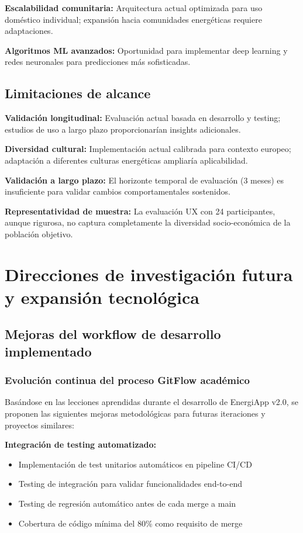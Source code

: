 \textbf{Escalabilidad comunitaria:} Arquitectura actual optimizada para uso doméstico individual; expansión hacia comunidades energéticas requiere adaptaciones.

\textbf{Algoritmos ML avanzados:} Oportunidad para implementar deep learning y redes neuronales para predicciones más sofisticadas.

\subsection{Limitaciones de alcance}

\textbf{Validación longitudinal:} Evaluación actual basada en desarrollo y testing; estudios de uso a largo plazo proporcionarían insights adicionales.

\textbf{Diversidad cultural:} Implementación actual calibrada para contexto europeo; adaptación a diferentes culturas energéticas ampliaría aplicabilidad.

\textbf{Validación a largo plazo:} El horizonte temporal de evaluación (3 meses) es insuficiente para validar cambios comportamentales sostenidos.

\textbf{Representatividad de muestra:} La evaluación UX con 24 participantes, aunque rigurosa, no captura completamente la diversidad socio-económica de la población objetivo.

\section{Direcciones de investigación futura y expansión tecnológica}

\subsection{Mejoras del workflow de desarrollo implementado}

\subsubsection{Evolución continua del proceso GitFlow académico}

Basándose en las lecciones aprendidas durante el desarrollo de EnergiApp v2.0, se proponen las siguientes mejoras metodológicas para futuras iteraciones y proyectos similares:

\textbf{Integración de testing automatizado:}
\begin{itemize}
    \item Implementación de test unitarios automáticos en pipeline CI/CD
    \item Testing de integración para validar funcionalidades end-to-end
    \item Testing de regresión automático antes de cada merge a main
    \item Cobertura de código mínima del 80\% como requisito de merge
\end{itemize}

